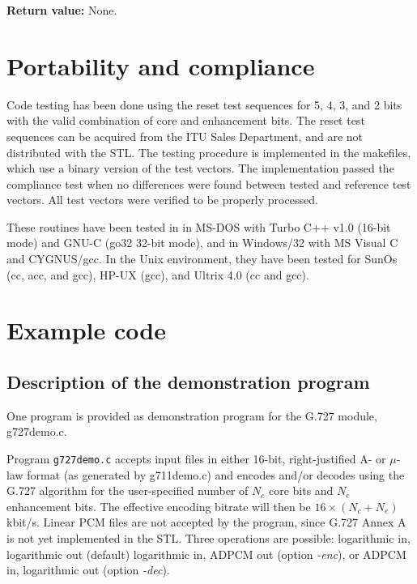 {\bf Return value: }        None.


\section{Portability and compliance} \label{G.727-Port}

Code testing has been done using the reset test sequences for 5, 4, 3,
and 2 bits with the valid combination of core and enhancement
bits. The reset test sequences can be acquired from the ITU Sales
Department, and are not distributed with the STL. The testing
procedure is implemented in the makefiles, which use a binary version
of the test vectors. The implementation passed the compliance test
when no differences were found between tested and reference test
vectors.  All test vectors were verified to be properly processed.

These routines have been tested in in MS-DOS with Turbo C++ v1.0
(16-bit mode) and GNU-C (go32 32-bit mode), and in Windows/32 with MS
Visual C and CYGNUS/gcc. In the Unix environment, they have been
tested for SunOs (cc, acc, and gcc), HP-UX (gcc), and Ultrix 4.0 (cc
and gcc).


\section{Example code}

\subsection {Description of the demonstration program}

One program is provided as demonstration program for the G.727 module,
g727demo.c.

Program {\tt g727demo.c} accepts input files in either 16-bit,
right-justified A- or $\mu$-law format (as generated by g711demo.c)
and encodes and/or decodes using the G.727 algorithm for the
user-specified number of $N_c$ core bits and $N_e$ enhancement
bits. The effective encoding bitrate will then be $16 \times
(N_c+N_e)$ kbit/s. Linear PCM files are not accepted by the program,
since G.727 Annex A \cite{G.727:LinearIO} is not yet implemented in
the STL. Three operations are possible: logarithmic in, logarithmic
out (default) logarithmic in, ADPCM out (option {\em -enc}), or ADPCM
in, logarithmic out (option {\em -dec}).

